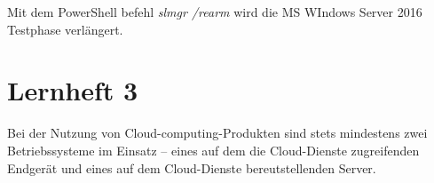 \documentclass[a4paper,10pt]{article}
\begin{document}
Mit dem PowerShell befehl \textit{slmgr /rearm} wird die MS WIndows Server 2016 Testphase verlängert.



















































\part{Lernheft 3}
Bei der Nutzung von Cloud-computing-Produkten sind stets mindestens zwei Betriebssysteme im Einsatz -- eines auf dem die Cloud-Dienste zugreifenden Endgerät und eines auf dem Cloud-Dienste bereutstellenden Server.
\end{document}
